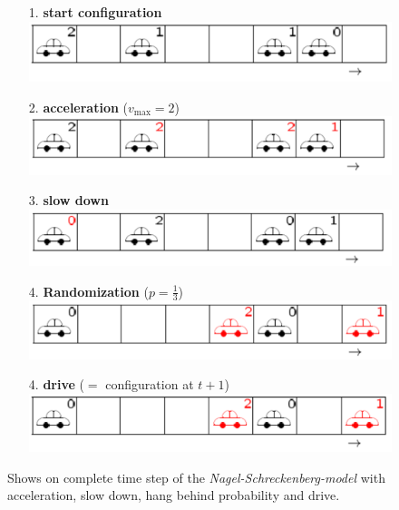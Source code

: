 \documentclass[11pt]{article}
\begin{document}
\begin{figure}[h!]
\begin{itemize}
\item[1.] \textbf{start configuration} \\
\includegraphics[width=\textwidth]{config_1.png}
\item[2.] \textbf{acceleration} ($v_{\mathrm{max}}=2$) \\
\includegraphics[width=\textwidth]{config_2.png}
\item[3.] \textbf{slow down} \\
\includegraphics[width=\textwidth]{config_3.png}
\item[4.] \textbf{Randomization} ($p=\frac{1}{3}$) \\
\includegraphics[width=\textwidth]{config_4.png}
\item[4.] \textbf{drive} ($=$ configuration at $t+1$) \\
\includegraphics[width=\textwidth]{config_5.png}
\end{itemize}
\caption{Shows on complete time step of the \textit{Nagel-Schreckenberg-model} with acceleration, slow down, hang behind probability and drive.}
\label{example_ns} 
\end{figure}\\
\end{document}
